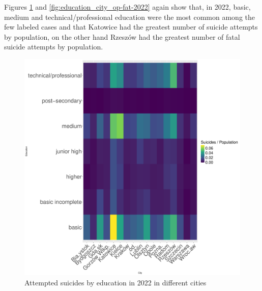 \documentclass{article}
\begin{document}
Figures \ref{fig:education_city_op-att-2022} and \ref{fig:education_city_op-fat-2022}
again show that, in 2022, basic, medium and technical/professional education were the most common
among the few labeled cases and that Katowice had the greatest number of suicide attempts by population,
on the other hand Rzeszów had the greatest number of fatal suicide attempts by population.
\begin{figure}[H]
    \centering
    \begin{minipage}{0.45\textwidth}
        \includegraphics[width=\textwidth]{imgs/education_city_op-att-2022.pdf}
        \caption{Attempted suicides by education  in 2022 in different cities}
	\label{fig:education_city_op-att-2022}
    \end{minipage}
    \hfill
    \begin{minipage}{0.45\textwidth}

\end{minipage}
\end{figure}
\end{document}
